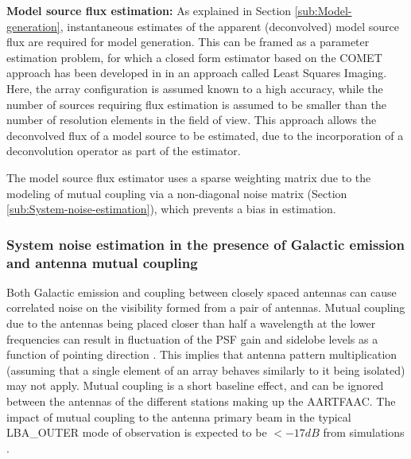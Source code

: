 \documentclass{aa}
\begin{document}
\textbf{Model    source   flux    estimation:}   As    explained    in   Section
\ref{sub:Model-generation},    instantaneous   estimates    of    the   apparent
(deconvolved) model source flux are  required for model generation.  This can be
framed  as a parameter  estimation problem,  for which  a closed  form estimator
based     on     the     COMET     approach    has     been     developed     in
\citep{wijnholds2008fundamental}  in an approach  called Least  Squares Imaging.
Here, the  array configuration is  assumed known to  a high accuracy,  while the
number of  sources requiring flux estimation  is assumed to be  smaller than the
number of  resolution elements in the  field of view.  This  approach allows the
deconvolved flux of a model source  to be estimated, due to the incorporation of
a    deconvolution    operator   as    part    of    the   estimator.


  The model  source flux estimator uses a  sparse weighting matrix
due to the modeling of mutual  coupling via a non-diagonal noise matrix (Section
\ref{sub:System-noise-estimation}), which prevents a bias in estimation.

\subsubsection{\label{sub:System-noise-estimation}System noise estimation in the
presence of Galactic emission and antenna mutual coupling}

Both Galactic  emission and coupling  between closely spaced antennas  can cause
correlated  noise on  the  visibility formed  from  a pair  of antennas.  Mutual
coupling due to  the antennas being placed closer than half  a wavelength at the
lower frequencies can result in fluctuation  of the PSF gain and sidelobe levels
as  a function  of pointing  direction \citep{agrawal1972mutual}.   This implies
that antenna pattern multiplication (assuming  that a single element of an array
behaves similarly  to it being  isolated) may not  apply.  Mutual coupling  is a
short baseline effect, and can be  ignored between the antennas of the different
stations making  up the AARTFAAC. The  impact of mutual coupling  to the antenna
primary beam  in the typical  LBA\_OUTER mode of  observation is expected  to be
$<-17dB$ from simulations \citep{wijnholds2011situ}.
\end{document}
